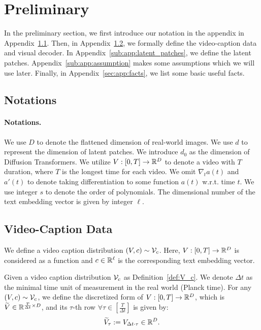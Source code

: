 \section{Preliminary} \label{sec:app:preli}

In the preliminary section, we first introduce our notation in the appendix in Appendix~\ref{sub:app:notations}.  Then, in Appendix~\ref{sub:app:video}, we formally define the video-caption data and visual decoder. In Appendix~\ref{sub:app:latent_patches}, we define the latent patches. Appendix~\ref{sub:app:assumption} makes some assumptions which we will use later. Finally, in Appendix~\ref{sec:app:facts}, we list some basic useful facts.

\subsection{Notations} \label{sub:app:notations}

\paragraph{Notations.} We use $D$ to denote the flattened dimension of real-world images. We use $d$ to represent the dimension of latent patches. We introduce $d_0$ as the dimension of Diffusion Transformers. We utilize $V: [0, T] \rightarrow \mathbb{R}^D$ to denote a video with $T$ duration, where $T$ is the longest time for each video. We omit $\nabla_t a(t)$ and $a'(t)$ to denote taking differentiation to some function $a(t)$ w.r.t. time $t$. We use integer $s$ to denote the order of polynomials. The dimensional number of the text embedding vector is given by integer $\ell$.

\subsection{Video-Caption Data} \label{sub:app:video}

\begin{definition}\label{def:V_c}
    We define a video caption distribution $(V, c) \sim {\cal V}_c$. Here, $V: [0, T] \rightarrow \mathbb{R}^D$ is considered as a function and $c \in \mathbb{R}^\ell$ is the corresponding text embedding vector.
\end{definition}

\begin{definition}\label{def:wt_V}
    Given a video caption distribution ${\cal V}_c$ as Definition~\ref{def:V_c}. We denote $\Delta t$ as the minimal time unit of measurement in the real world (Planck time). For any $(V, c) \sim {\cal V}_c$, we define the discretized form of $V: [0, T] \rightarrow \mathbb{R}^D$, which is $\widetilde{V} \in \mathbb{R}^{\frac{T}{\Delta t} \times D}$, and its $\tau$-th row $ \forall \tau \in [\frac{T}{\Delta t}]$ is given by:
    \begin{align*}
        \widetilde{V}_\tau := V_{\Delta t \cdot \tau} \in \mathbb{R}^D.
    \end{align*}
\end{definition}

